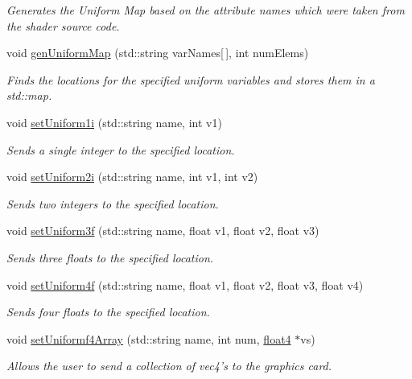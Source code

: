 \begin{DoxyCompactItemize}
\begin{DoxyCompactList}\small\item\em Generates the Uniform Map based on the attribute names which were taken from the shader source code. \end{DoxyCompactList}\item 
void \hyperlink{class_shader_a08a774e014a5ad959c06378749bce856}{gen\-Uniform\-Map} (std\-::string var\-Names\mbox{[}$\,$\mbox{]}, int num\-Elems)
\begin{DoxyCompactList}\small\item\em Finds the locations for the specified uniform variables and stores them in a std\-::map. \end{DoxyCompactList}\item 
void \hyperlink{class_shader_a0d5c21c96edd9c67599d26131251c5d3}{set\-Uniform1i} (std\-::string name, int v1)
\begin{DoxyCompactList}\small\item\em Sends a single integer to the specified location. \end{DoxyCompactList}\item 
void \hyperlink{class_shader_a54c535a7b501c40c3ae2b7b1dad80000}{set\-Uniform2i} (std\-::string name, int v1, int v2)
\begin{DoxyCompactList}\small\item\em Sends two integers to the specified location. \end{DoxyCompactList}\item 
void \hyperlink{class_shader_af73fceff123615dbc24b4b503515c974}{set\-Uniform3f} (std\-::string name, float v1, float v2, float v3)
\begin{DoxyCompactList}\small\item\em Sends three floats to the specified location. \end{DoxyCompactList}\item 
void \hyperlink{class_shader_a3b3f44fd8e54baa497cd16bf7fc09982}{set\-Uniform4f} (std\-::string name, float v1, float v2, float v3, float v4)
\begin{DoxyCompactList}\small\item\em Sends four floats to the specified location. \end{DoxyCompactList}\item 
void \hyperlink{class_shader_a9e717f21afd4f2473c6447fc2cfecaf1}{set\-Uniformf4\-Array} (std\-::string name, int num, \hyperlink{struct_shader_1_1float4}{float4} $\ast$vs)
\begin{DoxyCompactList}\small\item\em Allows the user to send a collection of vec4's to the graphics card. \end{DoxyCompactList}\item 

\end{DoxyCompactItemize}
